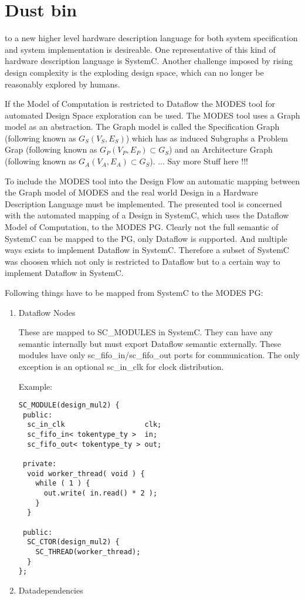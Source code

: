 \clearpage
\section{Dust bin}


to a new higher level hardware description
language for both system specification and system implementation is
desireable. One representative of this kind of hardware description
language is SystemC. Another challenge imposed by rising design complexity
is the exploding design space, which can no longer be reasonably explored
by humans.


If the Model of Computation is restricted to Dataflow the
MODES tool for automated Design Space exploration can be used. The MODES
tool uses a Graph model as an abstraction. The Graph model is called the
Specification Graph (following known as $G_{S}(V_{S},E_{S})$) which has as
induced Subgraphs a Problem Grap (following known as $G_{P}(V_{P},E_{P}) \subset G_{S}$) and
an Architecture Graph (following known as $G_{A}(V_{A},E_{A}) \subset G_{S}$).
... Say more Stuff here !!!
\par
To include the MODES tool into the Design Flow an automatic mapping between
the Graph model of MODES and the real world Design in a Hardware Description
Language must be implemented. The presented tool is concerned with the automated
mapping of a Design in SystemC, which uses the Dataflow Model of Computation,
to the MODES PG. Clearly not the full semantic of SystemC can be mapped to the
PG, only Dataflow is supported. And multiple ways exists to implement
Dataflow in SystemC. Therefore a subset of SystemC was choosen which not only
is restricted to Dataflow but to a certain way to implement Dataflow in SystemC.
\par
Following things have to be mapped from SystemC to the MODES PG:
\begin{enumerate}
\item Dataflow Nodes

These are mapped to SC\_MODULES in SystemC. They can have any semantic internally
but must export Dataflow semantic externally. These modules have only sc\_fifo\_in/sc\_fifo\_out
ports for communication. The only exception is an optional sc\_in\_clk for clock distribution.

Example:
\begin{verbatim}
SC_MODULE(design_mul2) {
 public:
  sc_in_clk                   clk;
  sc_fifo_in< tokentype_ty >  in;
  sc_fifo_out< tokentype_ty > out;

 private:
  void worker_thread( void ) {
    while ( 1 ) {
      out.write( in.read() * 2 );
    }
  }

 public:
  SC_CTOR(design_mul2) {
    SC_THREAD(worker_thread);
  }
};
\end{verbatim}
\item Datadependencies
\end{enumerate}

